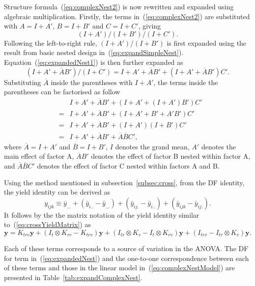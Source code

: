 \documentclass[11pt,a4paper]{article}
\begin{document}
Structure formula~(\ref{eq:complexNest2}) is now rewritten and expanded using algebraic multiplication. Firstly, the terms in~(\ref{eq:complexNest2}) are substituted with $A = I + A'$, $B = I + B'$ and $C = I + C'$, giving
\begin{equation}\label{eq:expandedNest1}
(I + A')/(I+ B')/(I + C').
\end{equation}
Following the left-to-right rule, $(I + A')/(I+ B')$ is first expanded using the result from basic nested design in~(\ref{eq:expandSimpleNest}). Equation~(\ref{eq:expandedNest1}) is then further expanded as
\begin{equation*}
(I + A'+ \overline{A}B')/(I + C') = I + A'+ \overline{A}B' + (I + A'+ \overline{A}B')C'.
\end{equation*}
Substituting $\overline{A}$ inside the parentheses with $I + A'$, the terms inside the parentheses can be factorised as follow
\begin{eqnarray}
\nonumber&&I + A'+ \overline{A}B' + (I + A'+ (I + A')B')C'\\
\nonumber&=& I + A'+ \overline{A}B' + (I + A'+ B' + A'B')C'\\
\nonumber&=& I + A'+ \overline{A}B' + (I + A')(I+ B')C'\\
\label{eq:expandedNest} &=& I + A' + \overline{A}B' + \overline{A}\overline{B}C',
\end{eqnarray}
where $\overline{A} = I + A'$ and $\overline{B} = I+ B'$, $I$ denotes the grand mean, $A'$ denotes the main effect of factor A, $\overline{A}B'$ denotes the effect of factor B nested within factor A, and $\overline{A}\overline{B}C'$ denotes the effect of factor C nested within factors A and B. 

Using the method mentioned in subsection~\ref{subsec:cross}, from the DF identity, the yield identity can be derived as
\begin{equation}\label{eq:simpleNestYield}
y_{ijk} \equiv \bar{y}_{...} + (\bar{y}_{i..} - \bar{y}_{...}) + (\bar{y}_{ij.} - \bar{y}_{i..}) + (\bar{y}_{ijk} - \bar{y}_{ij.}).
\end{equation}
It follows by the the matrix notation of the yield identity similar to~(\ref{eq:crossYieldMatrix}) as 
\begin{equation}\label{eq:simpleNestYieldMatrix}
\bm{y} = K_{trv}\bm{y} + (I_{t} \otimes K_{rv} - K_{trv})\bm{y} + (I_{tr} \otimes K_{v} - I_{t} \otimes K_{rv})\bm{y} + (I_{trv} -I_{tr} \otimes K_{v})\bm{y}.
\end{equation}

Each of these terms corresponds to a source of variation in the ANOVA. The DF for term in~(\ref{eq:expandedNest}) and the one-to-one correspondence between each of these terms and those in the linear model in~(\ref{eq:complexNestModel}) are presented in Table~\ref{tab:expandComplexNest}.
\end{document}
